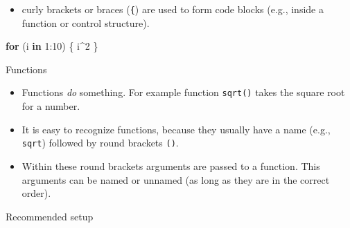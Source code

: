 \documentclass[ignorenonframetext,,t]{beamer}
\let\oldtextbf\textbf
\renewcommand{\textbf}[1]{\textcolor{spamwell}{\oldtextbf{#1}}}
\providecommand{\tightlist}{%
\setlength{\itemsep}{0pt}\setlength{\parskip}{0pt}}
\newenvironment{Shaded}{\begin{snugshade}}{\end{snugshade}}
\newcommand{\ControlFlowTok}[1]{\textcolor[rgb]{0.13,0.29,0.53}{\textbf{#1}}}
\newcommand{\DecValTok}[1]{\textcolor[rgb]{0.00,0.00,0.81}{#1}}
\newcommand{\NormalTok}[1]{#1}
\newcommand{\SpecialCharTok}[1]{\textcolor[rgb]{0.00,0.00,0.00}{#1}}
\providecommand{\tightlist}{%
\setlength{\itemsep}{0pt}\setlength{\parskip}{0pt}}
\renewcommand{\tightlist}{\setlength{\itemsep}{1.4ex}\setlength{\parskip}{0pt}}
\begin{document}
\begin{frame}[fragile]
\begin{itemize}
\tightlist
\item
  curly brackets or braces (\texttt{\{}) are used to form code blocks
  (e.g., inside a function or control structure).
\end{itemize}

\begin{Shaded}
\begin{Highlighting}[]
\ControlFlowTok{for}\NormalTok{ (i }\ControlFlowTok{in} \DecValTok{1}\SpecialCharTok{:}\DecValTok{10}\NormalTok{) \{}
\NormalTok{  i}\SpecialCharTok{\^{}}\DecValTok{2}
\NormalTok{\} }
\end{Highlighting}
\end{Shaded}
\end{frame}

\begin{frame}[fragile]
\begin{block}{Functions}
\protect\hypertarget{functions}{}
\begin{itemize}
\tightlist
\item
  Functions \emph{do} something. For example function \texttt{sqrt()}
  takes the square root for a number.
\item
  It is easy to recognize functions, because they usually have a name
  (e.g., \texttt{sqrt}) followed by round brackets \texttt{()}.
\item
  Within these round brackets arguments are passed to a function. This
  arguments can be named or unnamed (as long as they are in the correct
  order).
\end{itemize}
\end{block}
\end{frame}

\begin{frame}{Recommended setup}
\protect\hypertarget{recommended-setup}{}
\end{frame}
\end{document}
